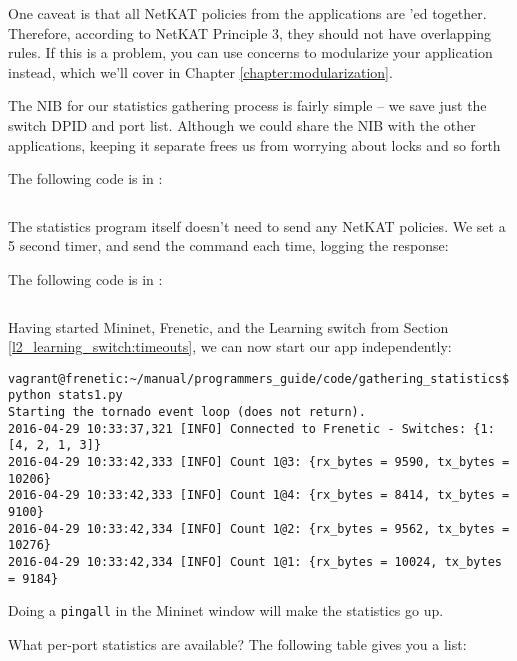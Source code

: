One caveat is that all NetKAT policies from the applications are 'ed together.  
Therefore, according
to NetKAT Principle 3, they should not have overlapping rules.  If this is a problem, you can use 
concerns to modularize your application instead, which we'll cover in Chapter \ref{chapter:modularization}.

The NIB for our statistics gathering process is fairly simple -- we save just the switch DPID and 
port list.  Although we could share the NIB with the other applications, keeping it separate frees us
from worrying about locks and so forth

The following code is in :

\inputminted{python}{code/gathering_statistics/network_information_base.py}

The statistics program itself doesn't need to send any NetKAT policies.  We set a 5 second timer,
and send the  command each time, logging the response:

The following code is in :

\inputminted{python}{code/gathering_statistics/stats1.py}

Having started Mininet, Frenetic, and the Learning switch  from Section 
\ref{l2_learning_switch:timeouts}, we can now start our app independently:

\begin{verbatim}
vagrant@frenetic:~/manual/programmers_guide/code/gathering_statistics$ python stats1.py
Starting the tornado event loop (does not return).
2016-04-29 10:33:37,321 [INFO] Connected to Frenetic - Switches: {1: [4, 2, 1, 3]}
2016-04-29 10:33:42,333 [INFO] Count 1@3: {rx_bytes = 9590, tx_bytes = 10206}
2016-04-29 10:33:42,333 [INFO] Count 1@4: {rx_bytes = 8414, tx_bytes = 9100}
2016-04-29 10:33:42,334 [INFO] Count 1@2: {rx_bytes = 9562, tx_bytes = 10276}
2016-04-29 10:33:42,334 [INFO] Count 1@1: {rx_bytes = 10024, tx_bytes = 9184}
\end{verbatim}

Doing a \texttt{pingall} in the Mininet window will make the statistics go up.

What per-port statistics are available?  The following table gives you a list:

